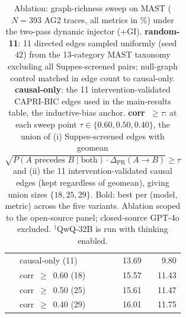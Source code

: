 \begin{table}[t]
\begin{tabular}{l l rr}
  & causal-only      (11) & 13.69          &  9.80          \\
  & corr~$\geq$~0.60 (18) & 15.57          & 11.43          \\
  & corr~$\geq$~0.50 (25) & 15.61          & 11.47          \\
  & corr~$\geq$~0.40 (29) & 16.01          & 11.75          \\
\bottomrule
\end{tabular}
\caption{%
  Ablation: graph-richness sweep on MAST ($N{=}393$ AG2 traces, all
  metrics in \%) under the two-pass dynamic injector (+GI).
  \textbf{random-11}: 11 directed edges sampled uniformly (seed $42$)
  from the 13-category MAST taxonomy excluding all Suppes-screened
  pairs; null-graph control matched in edge count to causal-only.
  \textbf{causal-only}: the 11 intervention-validated CAPRI-BIC edges
  used in the main-results table, the inductive-bias anchor.
  \textbf{corr~${\geq}\tau$}: at each sweep point
  $\tau\in\{0.60,0.50,0.40\}$, the union of (i) Suppes-screened edges
  with geomean
  $\sqrt{P(A\text{ precedes }B\mid\text{both})\cdot\Delta_{\mathrm{PR}}(A\!\to\!B)}\geq\tau$
  and (ii) the 11 intervention-validated causal edges (kept regardless
  of geomean), giving union sizes $\{18,25,29\}$.
  Bold: best per (model, metric) across the five variants.
  Ablation scoped to the open-source panel; closed-source GPT-4o
  excluded. $^{\dagger}$QwQ-32B is run with thinking enabled.%
}
\label{tab:mast_ablation_graph_richness}
\end{table}


